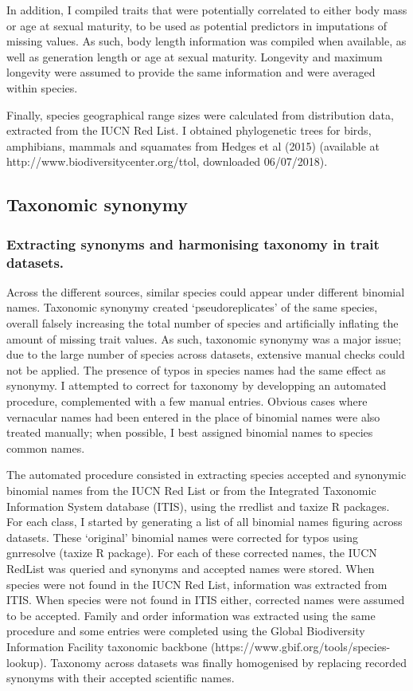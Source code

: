 In addition, I compiled traits that were potentially correlated to either body mass or age at sexual maturity, to be used as potential predictors in imputations of missing values. As such, body length information was compiled when available, as well as generation length or age at sexual maturity. Longevity and maximum longevity were assumed to provide the same information and were averaged within species.

Finally, species geographical range sizes were calculated from distribution data, extracted from the IUCN Red List. I obtained phylogenetic trees for birds, amphibians, mammals and squamates from Hedges et al (2015) (available at http://www.biodiversitycenter.org/ttol, downloaded 06/07/2018).


\subsection{Taxonomic synonymy}
\subsubsection{Extracting synonyms and harmonising taxonomy in trait datasets.}
Across the different sources, similar species could appear under different binomial names. Taxonomic synonymy created `pseudoreplicates' of the same species, overall falsely increasing the total number of species and artificially inflating the amount of missing trait values. As such, taxonomic synonymy was a major issue; due to the large number of species across datasets, extensive manual checks could not be applied. The presence of typos in species names had the same effect as synonymy. I attempted to correct for taxonomy by developping an automated procedure, complemented with a few manual entries. Obvious cases where vernacular names had been entered in the place of binomial names were also treated manually; when possible, I best assigned binomial names to species common names. 

The automated procedure consisted in extracting species accepted and synonymic binomial names from the IUCN Red List or from the Integrated Taxonomic Information System database (ITIS), using the rredlist and taxize R packages. For each class, I started by generating a list of all binomial names figuring across datasets. These `original' binomial names were corrected for typos using gnr\textunderscore resolve (taxize R package). For each of these corrected names, the IUCN RedList was queried and synonyms and accepted names were stored. When species were not found in the IUCN Red List, information was extracted from ITIS. When species were not found in ITIS either, corrected names were assumed to be accepted. Family and order information was extracted using the same procedure and some entries were completed using the Global Biodiversity Information Facility taxonomic backbone (https://www.gbif.org/tools/species-lookup). Taxonomy across datasets was finally homogenised by replacing recorded synonyms with their accepted scientific names.

